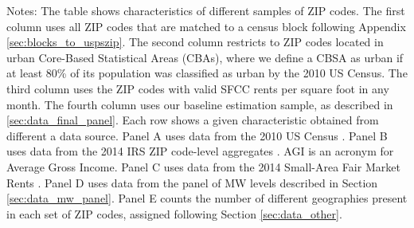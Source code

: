 \begin{landscape}
\begin{table}[hbt!]
    \begin{minipage}{.95\linewidth} \footnotesize
        \vspace{2mm}
        Notes: The table shows characteristics of different samples of ZIP codes.
        The first column uses all ZIP codes that are matched to a census block
        following Appendix \ref{sec:blocks_to_uspszip}.
        The second column restricts to ZIP codes located in urban Core-Based
        Statistical Areas (CBAs), where we define a CBSA as urban if at least
        80\% of its population was classified as urban by the 2010 US Census.
        The third column uses the ZIP codes with valid SFCC rents per square 
        foot in any month.
        The fourth column uses our baseline estimation sample, as described in 
        \ref{sec:data_final_panel}.
        Each row shows a given characteristic obtained from different a data 
        source.
        Panel A uses data from the 2010 US Census \parencite{CensusDecennial}.
        Panel B uses data from the 2014 IRS ZIP code-level aggregates
        \parencite{IRS}. AGI is an acronym for Average Gross Income.
        Panel C uses data from the 2014 Small-Area Fair Market 
        Rents \parencite[SAFMR;][]{hudSAFMR}.
        Panel D uses data from the panel of MW levels
        described in Section \ref{sec:data_mw_panel}.
        Panel E counts the number of different geographies present in each set
        of ZIP codes, assigned following Section \ref{sec:data_other}.
    \end{minipage}
\end{table}
\end{landscape}
